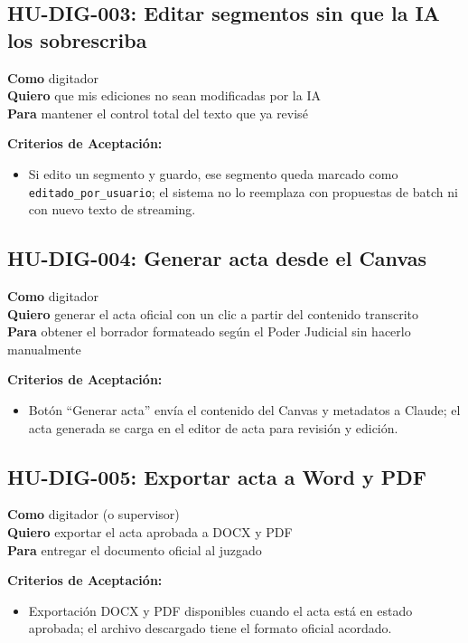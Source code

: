 \documentclass[12pt,a4paper]{report}
\begin{document}
\subsection{HU-DIG-003: Editar segmentos sin que la IA los sobrescriba}

\textbf{Como} digitador \\
\textbf{Quiero} que mis ediciones no sean modificadas por la IA \\
\textbf{Para} mantener el control total del texto que ya revisé

\textbf{Criterios de Aceptación:}
\begin{itemize}
    \item Si edito un segmento y guardo, ese segmento queda marcado como \texttt{editado\_por\_usuario}; el sistema no lo reemplaza con propuestas de batch ni con nuevo texto de streaming.
\end{itemize}

\subsection{HU-DIG-004: Generar acta desde el Canvas}

\textbf{Como} digitador \\
\textbf{Quiero} generar el acta oficial con un clic a partir del contenido transcrito \\
\textbf{Para} obtener el borrador formateado según el Poder Judicial sin hacerlo manualmente

\textbf{Criterios de Aceptación:}
\begin{itemize}
    \item Botón ``Generar acta'' envía el contenido del Canvas y metadatos a Claude; el acta generada se carga en el editor de acta para revisión y edición.
\end{itemize}

\subsection{HU-DIG-005: Exportar acta a Word y PDF}

\textbf{Como} digitador (o supervisor) \\
\textbf{Quiero} exportar el acta aprobada a DOCX y PDF \\
\textbf{Para} entregar el documento oficial al juzgado

\textbf{Criterios de Aceptación:}
\begin{itemize}
    \item Exportación DOCX y PDF disponibles cuando el acta está en estado aprobada; el archivo descargado tiene el formato oficial acordado.
\end{itemize}
\end{document}
